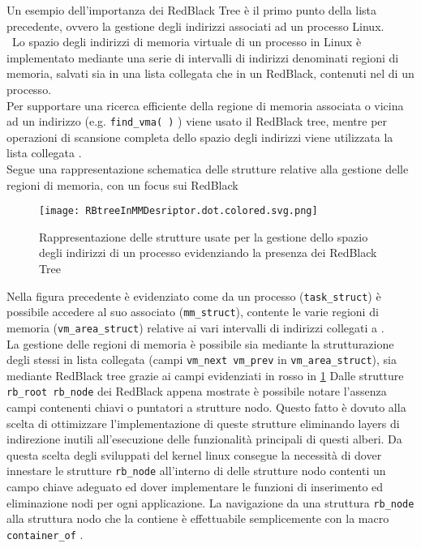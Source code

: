 \cite{lwnAgumentedRBtrees}
\voidLine
\label{chSpMMAux:memRegionRBTree}
Un esempio dell'importanza dei RedBlack Tree è il primo punto della lista precedente,
ovvero la gestione degli indirizzi associati ad un processo Linux.\\\
Lo spazio degli indirizzi di memoria virtuale di un processo in Linux è implementato mediante una serie
di intervalli di indirizzi denominati regioni di memoria, salvati sia in una lista collegata che in un RedBlack, contenuti
nel \vvv{Memory Descriptor} di un processo.\\
Per supportare una ricerca efficiente della regione di memoria associata o vicina ad un indirizzo
(e.g. \verb|find_vma( )| ) viene usato il RedBlack tree, 
mentre per operazioni di scansione completa dello spazio degli indirizzi viene utilizzata la lista collegata
\cite{ulk}.\\
\voidLine
Segue una rappresentazione schematica delle strutture relative alla gestione delle regioni di memoria, con
un focus sui RedBlack 
\begin{figure}[H]
  \centering \texttt{[image: RBtreeInMMDesriptor.dot.colored.svg.png]}
  \caption{Rappresentazione delle strutture usate per la gestione dello spazio degli indirizzi di un processo
			evidenziando la presenza dei RedBlack Tree}
  \decoRule \label{fig:RBtreeInMMDesriptor}
\end{figure}
Nella figura precedente è evidenziato come da un processo (\verb|task_struct|) è possibile
accedere al suo \vvv{Memory Descriptor} associato (\verb|mm_struct|), contente le varie 
regioni di memoria (\verb|vm_area_struct|) relative ai vari intervalli di indirizzi 
collegati a \vvv{p}.\\
La gestione delle regioni di memoria è possibile sia mediante la strutturazione degli stessi 
in lista collegata (campi \verb|vm_next vm_prev| in \verb|vm_area_struct|),
sia mediante RedBlack tree grazie ai campi evidenziati in rosso in \ref{fig:RBtreeInMMDesriptor}
\voidLine
Dalle strutture \verb|rb_root rb_node| dei RedBlack appena mostrate è possibile notare l'assenza 
campi contenenti chiavi o puntatori a strutture nodo. 
Questo fatto è dovuto alla scelta di ottimizzare l'implementazione di queste strutture eliminando 
layers di indirezione inutili all'esecuzione delle funzionalità principali di questi alberi.
Da questa scelta degli sviluppati del kernel linux consegue la necessità di dover 
innestare le strutture \verb|rb_node| all'interno di delle strutture nodo contenti un campo chiave adeguato
ed dover implementare le funzioni di inserimento ed eliminazione nodi per ogni applicazione.
La navigazione da una struttura \verb|rb_node| alla struttura nodo che la contiene è effettuabile
semplicemente con la macro \verb|container_of| .\\%

